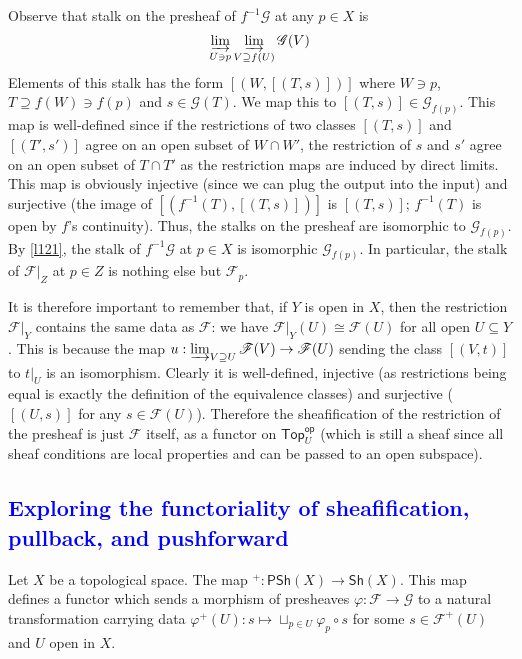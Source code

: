 \documentclass[12pt]{article}
\theoremstyle{remark}
\newcommand{\Top}[0]{\mathsf{Top}}
\newcommand{\op}[0]{\mathsf{op}}
\begin{document}
	Observe that stalk on the presheaf of $f^{-1}\mathscr G$ at any $p\in X$ is
	\[\varinjlim_{U\ni p}\varinjlim_{V\supseteq f(U)}\mathscr G(V)\]
	Elements of this stalk has the form $[(W, [(T, s)])]$ where $W\ni p$, $T\supseteq f(W)\ni f(p)$ and $s\in \mathscr G(T)$. We map this to $[(T, s)]\in\mathscr G_{f(p)}$. This map is well-defined since if the restrictions of two classes $[(T, s)]$ and $[(T', s')]$ agree on an open subset of $W\cap W'$, the restriction of $s$ and $s'$ agree on an open subset of $T\cap T'$ as the restriction maps are induced by direct limits. This map is obviously injective (since we can plug the output into the input) and surjective (the image of $[(f^{-1}(T), [(T, s)])]$ is $[(T, s)]$; $f^{-1}(T)$ is open by $f$'s continuity). Thus, the stalks on the presheaf are isomorphic to $\mathscr G_{f(p)}$. By \autoref{l121}, the stalk of $f^{-1}\mathscr G$ at $p\in X$ is isomorphic $\mathscr G_{f(p)}$. In particular, the stalk of $\mathscr F|_Z$ at $p\in Z$ is nothing else but $\mathscr F_p$.
	
	It is therefore important to remember that, if $Y$ is open in $X$, then the restriction $\mathscr F|_Y$ contains the same data as $\mathscr F$: we have $\mathscr F|_Y(U)\cong \mathscr F(U)$ for all open $U\subseteq Y$. This is because the map $u:\varinjlim_{V\supseteq U} \mathscr F(V)\to \mathscr F(U)$ sending the class $[(V, t)]$ to $t|_U$ is an isomorphism. Clearly it is well-defined, injective (as restrictions being equal is exactly the definition of the equivalence classes) and surjective ($[(U, s)]$ for any $s\in \mathscr F(U)$). Therefore the sheafification of the restriction of the presheaf is just $\mathscr F$ itself, as a functor on $\Top_U^\op$ (which is still a sheaf since all sheaf conditions are local properties and can be passed to an open subspace).
	\textcolor{blue}{
	\subsection{Exploring the functoriality of sheafification, pullback, and pushforward}\label{ssec-functoriality}
	}
	Let $X$ be a topological space. The map ${}^+:\mathsf{PSh}(X)\to \mathsf{Sh}(X)$. This map defines a functor which sends a morphism of presheaves $\varphi:\mathscr F\to\mathscr G$ to a natural transformation carrying data $\varphi^+(U):s\mapsto \sqcup_{p\in U}\varphi_p\circ s$ for some $s\in \mathscr F^+(U)$ and $U$ open in $X$.
	
\end{document}
